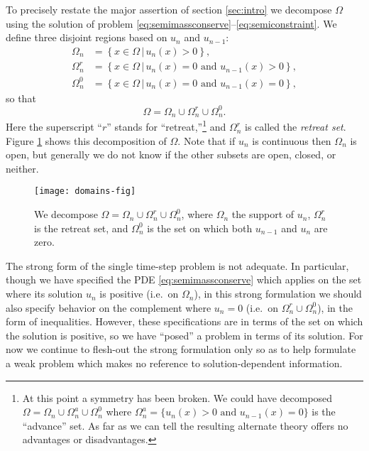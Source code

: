\documentclass[final,leqno,onefignum,onetabnum]{siamltex1213bueler}
\begin{document}
To precisely restate the major assertion of section \ref{sec:intro} we decompose $\Omega$ using the solution of problem \eqref{eq:semimassconserve}--\eqref{eq:semiconstraint}.   We define three disjoint regions based on $u_n$ and $u_{n-1}$:
\begin{align*}
\Omega_n &= \left\{x \in \Omega \,\big|\, u_n(x)>0\right\}, \\
\Omega_n^r &= \left\{x \in \Omega \,\big|\, u_n(x)=0 \text{ and } u_{n-1}(x) > 0\right\}, \\
\Omega_n^0 &= \left\{x \in \Omega \,\big|\, u_n(x)=0 \text{ and } u_{n-1}(x) = 0\right\},
\end{align*}
so that
\begin{equation}
\Omega = \Omega_n \cup \Omega_n^r \cup \Omega_n^0.  \label{eq:omegadecomposition}
\end{equation}
Here the superscript ``$r$'' stands for ``retreat,''\footnote{At this point a symmetry has been broken.  We could have decomposed $\Omega= \Omega_n \cup \Omega_n^a \cup \Omega_n^0$ where $\Omega_n^a = \{u_n(x) > 0 \text{ and } u_{n-1}(x) = 0\}$ is the ``advance'' set.  As far as we can tell the resulting alternate theory offers no advantages or disadvantages.} and $\Omega_n^r$ is called the \emph{retreat set}.  Figure \ref{fig:domains} shows this decomposition of $\Omega$.  Note that if $u_n$ is continuous then $\Omega_n$ is open, but generally we do not know if the other subsets are open, closed, or neither.

\begin{figure}[ht]
\begin{center}
\texttt{[image: domains-fig]}
\end{center}
\caption{We decompose $\Omega = \Omega_n \cup \Omega_n^r \cup \Omega_n^0$, where $\Omega_n$ the support of $u_n$, $\Omega_n^r$ is the retreat set, and $\Omega_n^0$ is the set on which both $u_{n-1}$ and $u_n$ are zero.}
\label{fig:domains}
\end{figure}

The strong form of the single time-step problem is not adequate.  In particular, though we have specified the PDE \eqref{eq:semimassconserve} which applies on the set where its solution $u_n$ is positive (i.e.~on $\Omega_n$), in this strong formulation we should also specify behavior on the complement where $u_n=0$ (i.e.~on $\Omega_n^r \cup \Omega_n^0$), in the form of inequalities.  However, these specifications are in terms of the set on which the solution is positive, so we have ``posed'' a problem in terms of its solution.  For now we continue to flesh-out the strong formulation only so as to help formulate a weak problem which makes no reference to solution-dependent information.
\end{document}

